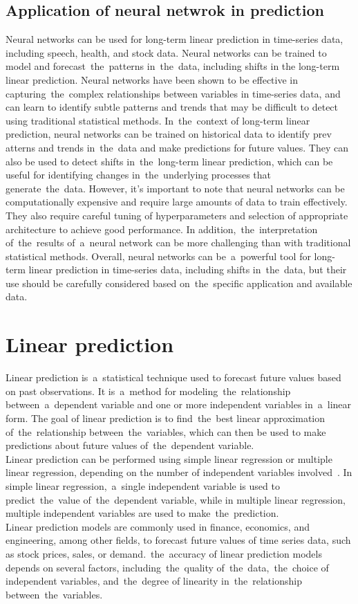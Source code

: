 \subsection{Application of neural netwrok in prediction} \label{subsec:nnprediction}
Neural networks can be used for long-term linear prediction in time-series data, including speech, health, and
stock data. Neural networks can be trained to model and forecast~the~patterns in~the~data, including shifts in
the long-term linear prediction. Neural networks have been shown to be effective in capturing~the~complex relationships
between variables in time-series data, and can learn to identify subtle patterns and trends that may be difficult
to detect using traditional statistical methods. In~the~context of long-term linear prediction, neural networks can be
trained on historical data to identify prev    atterns and trends in~the~data and make predictions for future values.
They can also be used to detect shifts in~the~long-term linear prediction, which can be useful for identifying
changes in~the~underlying processes that generate~the~data. However, it's important to note that neural networks
can be computationally expensive and require large amounts of data to train effectively. They also require careful
tuning of hyperparameters and selection of appropriate architecture to achieve good performance.
In addition,~the~interpretation of~the~results of~a~neural network can be more challenging than with traditional
statistical methods. Overall, neural networks can be~a~powerful tool for long-term linear prediction in time-series
data, including shifts in~the~data, but their use should be carefully considered based on~the~specific
application and available data.


\section{Linear prediction} \label{sec:lp}
Linear prediction is~a~statistical technique used to forecast future values based on past observations. It is~a~method
for modeling~the~relationship between~a~dependent variable and one or more independent variables in~a~linear form.
The goal of linear prediction is to find~the~best linear approximation of~the~relationship between~the~variables,
which can then be used to make predictions about future values of~the~dependent variable.
\\
Linear prediction can be performed using simple linear regression or multiple linear regression, depending on the
number of independent variables involved~\cite{Parks}. In simple linear regression,~a~single independent variable is
used to predict~the~value of~the~dependent variable, while in multiple linear regression, multiple independent
variables are used to make~the~prediction.
\\
Linear prediction models are commonly used in finance, economics, and engineering, among other fields, to forecast
future values of time series data, such as stock prices, sales, or demand.~the~accuracy of linear prediction models
depends on several factors, including~the~quality of~the~data,~the~choice of independent variables, and~the~degree of
linearity in~the~relationship between~the~variables.

